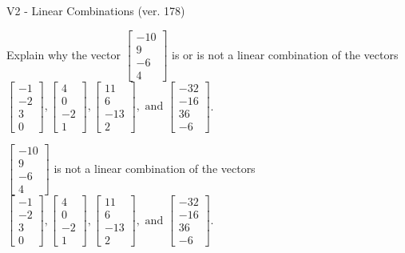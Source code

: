 \begin{exercise}
  \begin{exerciseTitle}V2 - Linear Combinations (ver. 178)\end{exerciseTitle}
  \begin{exerciseStatement}
    Explain why the vector \(\left[\begin{array}{c}
-10 \\
9 \\
-6 \\
4
\end{array}\right]\)  is or is not a linear 
	combination of the vectors \(\left[\begin{array}{c}
-1 \\
-2 \\
3 \\
0
\end{array}\right] , \left[\begin{array}{c}
4 \\
0 \\
-2 \\
1
\end{array}\right] , \left[\begin{array}{c}
11 \\
6 \\
-13 \\
2
\end{array}\right] , \text{ and } \left[\begin{array}{c}
-32 \\
-16 \\
36 \\
-6
\end{array}\right]\).
	


  \end{exerciseStatement}
  \begin{exerciseAnswer}
   \(\left[\begin{array}{c}
-10 \\
9 \\
-6 \\
4
\end{array}\right]\) 
  	 is not  
	a linear combination of the vectors \(\left[\begin{array}{c}
-1 \\
-2 \\
3 \\
0
\end{array}\right] , \left[\begin{array}{c}
4 \\
0 \\
-2 \\
1
\end{array}\right] , \left[\begin{array}{c}
11 \\
6 \\
-13 \\
2
\end{array}\right] , \text{ and } \left[\begin{array}{c}
-32 \\
-16 \\
36 \\
-6
\end{array}\right]\).


\end{exerciseAnswer}
\end{exercise}
